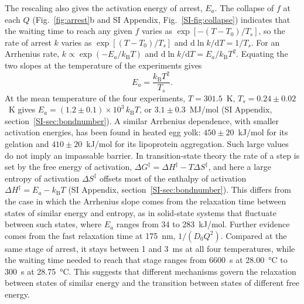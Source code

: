 \documentclass[journal=nalefd,manuscript=letter,layout=traditional]{achemso}
\begin{document}
The rescaling also gives the activation energy of arrest, $E_a$. The collapse of $f$ at each $Q$ (Fig.~\ref{fig:arrest}b and SI Appendix, Fig.~\ref*{SI-fig:collapse}) indicates that the waiting time to reach any given $f$ varies as $\exp[-(T-T_0)/T_s]$, so the rate of arrest $k$ varies as $\exp[(T-T_0)/T_s]$ and $\mathrm{d}\ln k/\mathrm{d}T=1/T_s$. For an Arrhenius rate, $k\propto\exp(-E_a/k_\mathrm{B}T)$ and $\mathrm{d}\ln k/\mathrm{d}T=E_a/k_\mathrm{B}T^2$. Equating the two slopes at the temperature of the experiments gives
\begin{equation}
 E_a=\frac{k_\mathrm{B}T^2}{T_s}.
 \label{eq:ea}
\end{equation}
At the mean temperature of the four experiments, $T=301.5$~K, $T_s=0.24\pm0.02$~K gives $E_a=(1.2\pm0.1)\times10^{3}\,k_\mathrm{B}T$, or $3.1\pm0.3$~MJ/mol (SI Appendix, section~\ref*{SI-sec:bondnumber}). A similar Arrhenius dependence, with smaller activation energies, has been found in heated egg yolk: $450\pm20$~kJ/mol for its gelation and $410\pm20$~kJ/mol for its lipoprotein aggregation.\cite{Anthuparambil2023-nc} Such large values do not imply an impassable barrier. In transition-state theory the rate of a step is set by the free energy of activation, $\Delta G^\ddagger=\Delta H^\ddagger-T\Delta S^\ddagger$, and here a large entropy of activation $\Delta S^\ddagger$ offsets most of the enthalpy of activation $\Delta H^\ddagger=E_a-k_\mathrm{B}T$ (SI Appendix, section~\ref*{SI-sec:bondnumber}). This differs from the case in which the Arrhenius slope comes from the relaxation time between states of similar energy and entropy, as in solid-state systems that fluctuate between such states, where $E_a$ ranges from 34 to 283~kJ/mol.\cite{Zhang2017-oz,Ruta2014-nc,Stana2013-cm} Further evidence comes from the fast relaxation time at \SI{175}{\nano\meter}, $1/(D_0Q^2)$. Compared at the same stage of arrest, it stays between 1 and 3~ms at all four temperatures, while the waiting time needed to reach that stage ranges from \SI{6600}{\second} at \SI{28.00}{\degreeCelsius} to \SI{300}{\second} at \SI{28.75}{\degreeCelsius}. This suggests that different mechanisms govern the relaxation between states of similar energy and the transition between states of different free energy.
\end{document}
